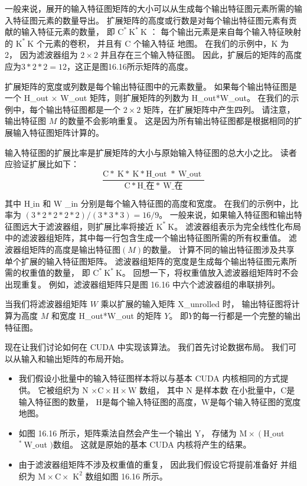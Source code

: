 一般来说，展开的输入特征图矩阵的大小可以从生成每个输出特征图元素所需的输入特征图元素的数量导出。 
扩展矩阵的高度或行数是对每个输出特征图元素有贡献的输入特征元素的数量，
即 $\mathrm{C}^{*} \mathrm{~K}^{*} \mathrm{~K}$ ：
每个输出元素是来自每个输入特征映射的 $\mathrm{K}^{*} \mathrm{~K}$ 个元素的卷积，
并且有 $\mathrm{C}$ 个输入特征 地图。 在我们的示例中，$\mathrm{K}$ 为 2，
因为滤波器组为 $2 \times 2$ 并且存在三个输入特征图。 
因此，扩展后的矩阵的高度应为$3 * 2 * 2=12$，这正是图16.16所示矩阵的高度。

扩展矩阵的宽度或列数是每个输出特征图中的元素数量。 
如果每个输出特征图是一个 H\_out $\times$ W\_out 矩阵，则扩展矩阵的列数为 H\_out*W\_out。 
在我们的示例中，每个输出特征图都是一个 $2 \times 2$ 矩阵，在扩展矩阵中产生四列。 
请注意，输出特征图 $M$ 的数量不会影响重复。 这是因为所有输出特征图都是根据相同的扩展输入特征图矩阵计算的。

输入特征图的扩展比率是扩展矩阵的大小与原始输入特征图的总大小之比。 读者应验证扩展比如下：
$$
\frac{\mathrm{C} * \mathrm{~K} * \mathrm{~K} * \mathrm{H} \_ \text {out } * \mathrm{~W} \_ \text {out }} {\mathrm{C} * \mathrm{H} \_ \text {在} * \mathrm{~W} \_ \text {在}}
$$

其中 $\mathrm{H} \_$in 和 $\mathrm{W}$ \_in 分别是每个输入特征图的高度和宽度。 
在我们的示例中，比率为 $(3 * 2 * 2 * 2 * 2) /(3 * 3 * 3)=16 / 9$。 
一般来说，如果输入特征图和输出特征图远大于滤波器组，则扩展比率将接近 $\mathrm{K}^{*} \mathrm{~K}$。 
滤波器组表示为完全线性化布局中的滤波器组矩阵，其中每一行包含生成一个输出特征图所需的所有权重值。 
滤波器组矩阵的高度是输出特征图$(M)$的数量。 计算不同的输出特征图涉及共享单个扩展的输入特征图矩阵。 
滤波器组矩阵的宽度是生成每个输出特征图元素所需的权重值的数量，
即 $\mathrm{C}^{*} \mathrm{~K}^{*} \mathrm{~ K}$。 回想一下，将权重值放入滤波器组矩阵时不会出现重复。 
例如，滤波器组矩阵只是图 16.16 中六个滤波器组的串联排列。

当我们将滤波器组矩阵 $W$ 乘以扩展的输入矩阵 X\_unrolled 时，
输出特征图将计算为高度 $M$ 和宽度 H\_out*W\_out 的矩阵 $Y$。 即$Y$的每一行都是一个完整的输出特征图。

现在让我们讨论如何在 CUDA 中实现该算法。 我们首先讨论数据布局。 
我们可以从输入和输出矩阵的布局开始。
\begin{itemize}
   \item 我们假设小批量中的输入特征图样本将以与基本 CUDA 内核相同的方式提供。 
   	它被组织为 $\mathrm{N}$ $\times \mathrm{C} \times \mathrm{H} \times \mathrm{W}$ 数组，
   	其中 $\mathrm{N}$ 是样本数 在小批量中，$\mathrm{C}$是输入特征图的数量，
   	$\mathrm{H}$是每个输入特征图的高度，$\mathrm{W}$是每个输入特征图的宽度 地图。

   \item 如图 16.16 所示，矩阵乘法自然会产生一个输出 Y，
   	存储为 $\mathrm{M} \times\left(\mathrm{H} \_\right.$out ${ }^{ *} \mathrm{~W} \_$out $)$数组。 
   	这就是原始的基本 CUDA 内核将产生的结果。

   \item 由于滤波器组矩阵不涉及权重值的重复，
   	因此我们假设它将提前准备好
   	并组织为 $\mathrm{M} \times \mathrm{C} \times$ $\mathrm{K }^{2}$ 数组如图 16.16 所示。
\end{itemize}

